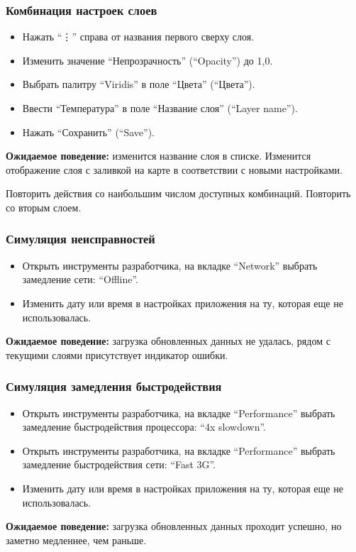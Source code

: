 \documentclass[a4paper, 12pt]{article}
\begin{document}
	\subsubsection{Комбинация настроек слоев}
	\begin{itemize}
		\item Нажать \enquote{\vdots} справа от названия первого сверху слоя.
		\item Изменить значение \enquote{Непрозрачность} (\enquote{Opacity}) до 1,0.
		\item Выбрать палитру \enquote{Viridis} в поле \enquote{Цвета} (\enquote{Цвета}).
		\item Ввести \enquote{Температура} в поле \enquote{Название слоя} (\enquote{Layer name}).
		\item Нажать \enquote{Сохранить} (\enquote{Save}).
	\end{itemize}
	\textbf{Ожидаемое поведение:} изменится название слоя в списке. Изменится отображение слоя с заливкой на карте в соответствии с новыми настройками.

	Повторить действия со наибольшим числом доступных комбинаций. Повторить со вторым слоем.

	\subsubsection{Симуляция неисправностей}
	\begin{itemize}
		\item Открыть инструменты разработчика, на вкладке \enquote{Network} выбрать замедление сети: \enquote{Offline}.
		\item Изменить дату или время в настройках приложения на ту, которая еще не использовалась.
	\end{itemize}
	\textbf{Ожидаемое поведение:} загрузка обновленных данных не удалась, рядом с текущими слоями присутствует индикатор ошибки.

	\subsubsection{Симуляция замедления быстродействия}
	\begin{itemize}
		\item Открыть инструменты разработчика, на вкладке \enquote{Performance} выбрать замедление быстродействия процессора: \enquote{4x slowdown}.
		\item Открыть инструменты разработчика, на вкладке \enquote{Performance} выбрать замедление быстродействия сети: \enquote{Fast 3G}.
		\item Изменить дату или время в настройках приложения на ту, которая еще не использовалась.
	\end{itemize}
	\textbf{Ожидаемое поведение:} загрузка обновленных данных проходит успешно, но заметно медленнее, чем раньше.
\end{document}
